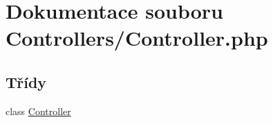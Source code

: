 \hypertarget{_controller_8php}{\section{Dokumentace souboru Controllers/\-Controller.php}
\label{_controller_8php}
}
\subsection*{Třídy}
\begin{DoxyCompactItemize}
\item 
class \hyperlink{class_controller}{Controller}
\end{DoxyCompactItemize}
